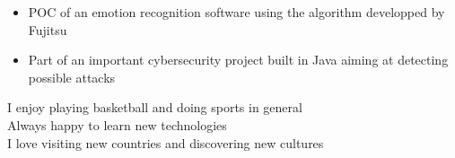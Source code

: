 \documentclass[10pt,a4paper,ragged2e]{altacv}
\begin{document}




\begin{itemize}
	\item POC of an emotion recognition software using the algorithm developped by Fujitsu
\end{itemize}
\divider
{}
\begin{itemize}
	\item Part of an important cybersecurity project built in Java aiming at detecting possible attacks
\end{itemize}

\medskip

	\cvtag{\faHeartbeat} I enjoy playing basketball and doing sports in general \\
	\cvtag{\faSpinner} Always happy to learn new technologies \\
	\cvtag{\faPlane} I love visiting new countries and discovering new cultures

\end{document}
